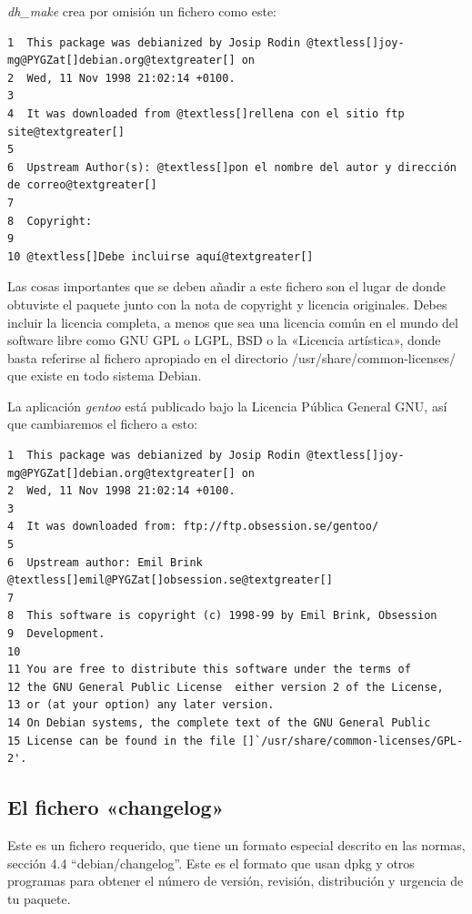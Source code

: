 \documentclass[letterpaper,12pt,spanish]{manual}
\begin{document}
\emph{dh\_make} crea por omisión un fichero como este:

\begin{Verbatim}[commandchars=@\[\]]
1  This package was debianized by Josip Rodin @textless[]joy-mg@PYGZat[]debian.org@textgreater[] on
2  Wed, 11 Nov 1998 21:02:14 +0100.
3
4  It was downloaded from @textless[]rellena con el sitio ftp site@textgreater[]
5
6  Upstream Author(s): @textless[]pon el nombre del autor y dirección de correo@textgreater[]
7
8  Copyright:
9
10 @textless[]Debe incluirse aquí@textgreater[]
\end{Verbatim}

Las cosas importantes que se deben añadir a este fichero son el lugar de donde obtuviste el paquete junto con la nota de copyright y licencia originales. Debes incluir la licencia completa, a menos que sea una licencia común en el mundo del software libre como GNU GPL o LGPL, BSD o la «Licencia artística», donde basta referirse al fichero apropiado en el directorio /usr/share/common-licenses/ que existe en todo sistema Debian.

La aplicación \emph{gentoo} está publicado bajo la Licencia Pública General GNU, así que cambiaremos el fichero a esto:

\begin{Verbatim}[commandchars=@\[\]]
1  This package was debianized by Josip Rodin @textless[]joy-mg@PYGZat[]debian.org@textgreater[] on
2  Wed, 11 Nov 1998 21:02:14 +0100.
3
4  It was downloaded from: ftp://ftp.obsession.se/gentoo/
5
6  Upstream author: Emil Brink @textless[]emil@PYGZat[]obsession.se@textgreater[]
7
8  This software is copyright (c) 1998-99 by Emil Brink, Obsession
9  Development.
10
11 You are free to distribute this software under the terms of
12 the GNU General Public License  either version 2 of the License,
13 or (at your option) any later version.
14 On Debian systems, the complete text of the GNU General Public
15 License can be found in the file []`/usr/share/common-licenses/GPL-2'.
\end{Verbatim}


\subsection{El fichero «changelog»}

Este es un fichero requerido, que tiene un formato especial descrito en las normas, sección 4.4 ``debian/changelog''. Este es el formato que usan dpkg y otros programas para obtener el número de versión, revisión, distribución y urgencia de tu paquete.
\end{document}
